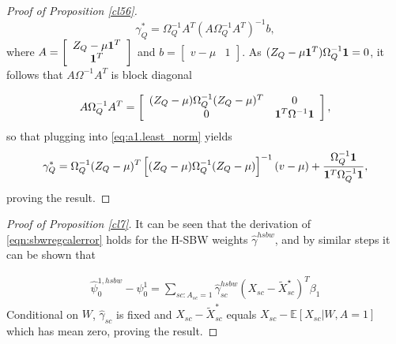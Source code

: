 \begin{proof}[Proof of Proposition \ref{cl56}]
\begin{equation}\label{eq:a1.least_norm}
 \gamma_Q^* = \Omega^{-1}_Q A^T (A\Omega^{-1}_QA^T)^{-1} b,
\end{equation}
where $A = \left[ \begin{array}{c} Z_Q - \mu {\bf 1}^T\\ {\bf 1}^T \end{array}\right]$ and $b = \left[\begin{array}{c} v - \mu & 1 \end{array}\right]$. As $(Z_{Q} - \mu{\bf 1}^T)\Omega_Q^{-1} {\bf 1} = 0$, it follows that $A\Omega^{-1}A^T$ is block diagonal

\[ A\Omega_Q^{-1}A^T = \left[\begin{array}{cc} (Z_Q - \mu)\Omega_Q^{-1} (Z_Q- \mu)^T & 0  \\ 0 & {\bf 1}^T \Omega^{-1}{\bf 1}\end{array}\right], \]
so that plugging into \eqref{eq:a1.least_norm} yields
 \begin{equation*}
 \gamma^*_{Q} = \Omega_{Q}^{-1} (Z_{Q} - \mu)^T\left[ (Z_Q - \mu) \Omega_{Q}^{-1} (Z_Q - \mu)\right]^{-1} (v - \mu) + \frac{\Omega^{-1}_Q {\bf 1} }{{\bf 1}^T \Omega^{-1}_Q {\bf 1}},
 \end{equation*}
proving the result.

\end{proof}    
    
\begin{proof}[Proof of Proposition \ref{cl7}]
   It can be seen that the derivation of \eqref{eqn:sbwregcalerror} holds for the H-SBW weights $\hat{\gamma}^{hsbw}$, and by similar steps it can be shown that 
    
    \begin{align*}
        \hat{\psi}^{1, hsbw}_0 - \psi^1_0 = \sum_{sc: A_{sc} = 1}\hat{\gamma}^{hsbw}_{sc}(X_{sc} - \tilde{X}_{sc}^\star)^T\beta_1
    \end{align*}
Conditional on $W$, $\hat{\gamma}_{sc}$ is fixed and $X_{sc} - \tilde{X}_{sc}^*$ equals $X_{sc} - \mathbb{E}[X_{sc}|W, A=1]$ which has mean zero, proving the result.
\end{proof}


